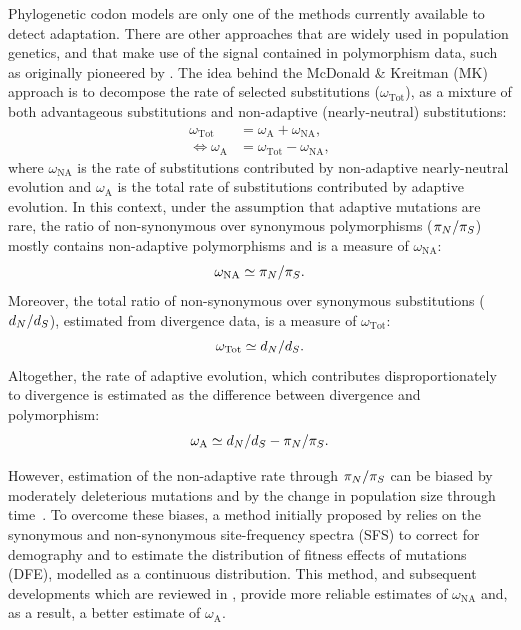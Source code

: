 Phylogenetic codon models are only one of the methods currently available to detect adaptation.
There are other approaches that are widely used in population genetics, and that make use of the signal contained in polymorphism data, such as originally pioneered by \citet{McDonald1991}.
The idea behind the McDonald \& Kreitman (\acrshort{MK}) approach is to decompose the rate of selected substitutions ($\omega_{\text{Tot}}$), as a mixture of both advantageous substitutions and non-adaptive (nearly-neutral) substitutions:
\begin{align}
    \omega_{\text{Tot}} & = \omega_{\text{A}} + \omega_{\text{NA}}, \\
    \iff \omega_{\text{A}} & = \omega_{\text{Tot}} - \omega_{\text{NA}},
\end{align}
where $\omega_{\text{NA}}$ is the rate of substitutions contributed by non-adaptive nearly-neutral evolution and $\omega_{\text{A}}$ is the total rate of substitutions contributed by adaptive evolution.
In this context, under the assumption that adaptive mutations are rare, the ratio of non-synonymous over synonymous polymorphisms ($\pi_N / \pi_S$) mostly contains non-adaptive polymorphisms and is a measure of $\omega_{\text{NA}}$:
\begin{equation}
    \omega_{\text{NA}} \simeq \pi_N / \pi_S.
\end{equation}
Moreover, the total ratio of non-synonymous over synonymous substitutions ($d_N / d_S$), estimated from divergence data, is a measure of $\omega_{\text{Tot}}$:
\begin{equation}
    \omega_{\text{Tot}} \simeq d_N / d_S.
\end{equation}
Altogether, the rate of adaptive evolution, which contributes disproportionately to divergence is estimated as the difference between divergence and polymorphism:
\begin{equation}
    \omega_{\text{A}} \simeq d_N / d_S - \pi_N / \pi_S.
\end{equation}

However, estimation of the non-adaptive rate through $\pi_N / \pi_S$ can be biased by moderately deleterious mutations and by the change in population size through time~\citep{eyre-walker_changing_2002}.
To overcome these biases, a method initially proposed by \citet{eyre-walker_estimating_2009, Galtier2016} relies on the synonymous and non-synonymous site-frequency spectra (\acrshort{SFS}) to correct for demography and to estimate the distribution of fitness effects of mutations (\acrshort{DFE}), modelled as a continuous distribution.
This method, and subsequent developments which are reviewed in \citet{Moutinho2019a}, provide more reliable estimates of $\omega_{\text{NA}}$ and, as a result, a better estimate of $\omega_{\text{A}}$.

